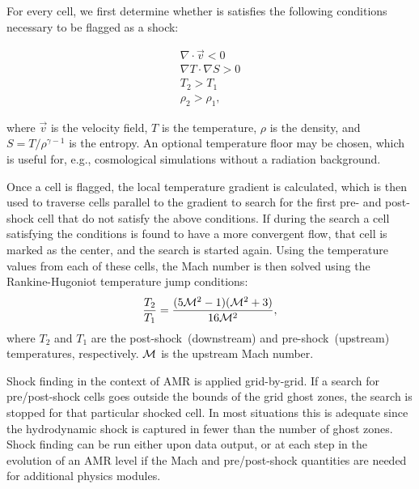 For every cell, we first determine whether is satisfies the following conditions
necessary to be flagged as a shock:

\begin{eqnarray}
\nabla \cdot \vec{v} < 0 \\
\nabla T \cdot \nabla S > 0\\
T_2 > T_1 \\
\rho_2 > \rho_1,
\end{eqnarray}

where $\vec{v}$ is the velocity field, $T$ is the temperature, $\rho$ is the
density, and $S=T/\rho^{\gamma-1}$ is the entropy.  An optional temperature floor
may be chosen, which is useful for, e.g., cosmological simulations without a radiation
background.

Once a cell is flagged, the local temperature gradient is calculated, which is 
then used to traverse cells parallel to the gradient to search for the first
pre- and post-shock cell that do not satisfy the above conditions.  If during
the search a cell satisfying the conditions is found to have a more convergent
flow, that cell is marked as the center, and the search is started again. Using the 
temperature values from each of these cells, the Mach number is then solved
using the Rankine-Hugoniot temperature jump conditions:
\begin{equation}
\frac{T_2}{T_1} = \frac{(5\Mach^2 - 1)(\Mach^2 + 3)}{16\Mach^2},
\end{equation}
where $T_2$ and $T_1$ are the post-shock~(downstream) and pre-shock~(upstream)
temperatures, respectively. $\mathcal{M}$ is the upstream Mach number.  

Shock finding in the context of AMR is applied grid-by-grid.  If a search for
pre/post-shock cells goes outside the bounds of the grid ghost zones, the
search is stopped for that particular shocked cell. In most situations this is
adequate since the hydrodynamic shock is captured in fewer than the number of
ghost zones.  Shock finding can be run either upon data output, or at each step
in the evolution of an AMR level if the Mach and pre/post-shock quantities are
needed for additional physics modules.

